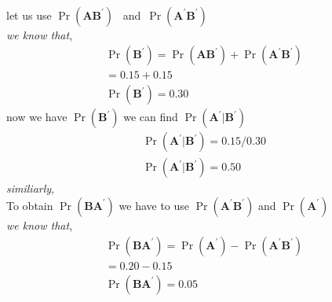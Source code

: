 \documentclass[journal,12pt,twocolumn]{IEEEtran}
\providecommand{\pr}[1]{\ensuremath{\Pr\left(#1\right)}}
\theoremstyle{remark}
\begin{document}
\\let us use \pr{\textbf{A}  \textbf{B} ^\prime} \ and\  \pr{\textbf{A} ^\prime \textbf{B}^\prime}
\\ \textit{we know that},
\begin{align*}
 \pr{\textbf{B}^ \prime}= \pr{\textbf{A} \textbf{B} ^\prime} + \pr{\textbf{A} ^\prime  \textbf{B} ^\prime}
\\              =0.15 +0.15
\\ \pr{\textbf{B} ^\prime}=0.30
\end{align*}
now we have \pr{\textbf{B} ^\prime} we can find \pr{\textbf{A} ^\prime|\textbf{B} ^\prime}
\begin{align*}
 \pr{\textbf{A}^\prime|\textbf{B} ^\prime}= 0.15/0.30
\\ \pr{\textbf{A} ^\prime|\textbf{B} ^\prime} = 0.50
\end{align*}
\linebreak
\textit{similiarly},
\\ To obtain \pr{\textbf{B} \textbf{A} ^\prime} we have to use \pr{\textbf{A} ^\prime  \textbf{B} ^\prime} and \pr{\textbf{A}^\prime}
\\ \textit{we know that},
\begin{align*}
 \pr{\textbf{B}  \textbf{A} ^\prime}=\pr{\textbf{A}^\prime}-\pr{\textbf{A} ^\prime \textbf{B} ^\prime}
\\   = 0.20-0.15
\\ \pr{\textbf{B}  \textbf{A}^\prime} = 0.05
\end{align*}
\end{document}
